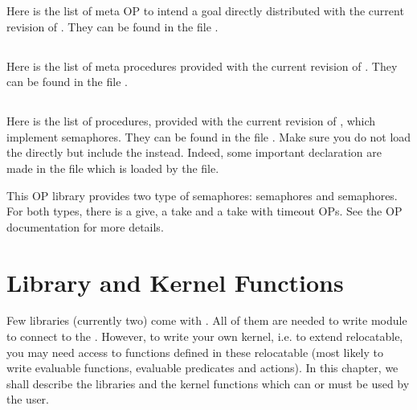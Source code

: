 Here is the list of meta OP to intend a goal directly distributed with the
current revision of \COPRSDE{}. They can be found in the file
.



\section{\protect{}}

Here is the list of meta procedures provided with the current revision
of \COPRSDE{}. They can be found in the file .




\section{\protect{}}

Here is the list of procedures, provided with the current revision of
\COPRSDE{}, which implement semaphores. They can be found in the file
. Make sure you do not load the  directly but
include the  instead. Indeed, some important declaration
are made in the   file which is loaded by the
 file.

This OP library provides two type of semaphores:  semaphores and
 semaphores. For both types, there is a give, a take and a take
with timeout OPs. See the OP documentation for more details.



\chapter{Library and Kernel Functions}

Few libraries (currently two) come with \COPRSDE{}. All of them are needed to
write module to connect to the \MPA{}. However, to write your own kernel, i.e.
to extend relocatable, you may need access to functions defined in these
relocatable (most likely to write evaluable functions, evaluable predicates and
actions). In this chapter, we shall describe the libraries and the kernel
functions which can or must be used by the user.



